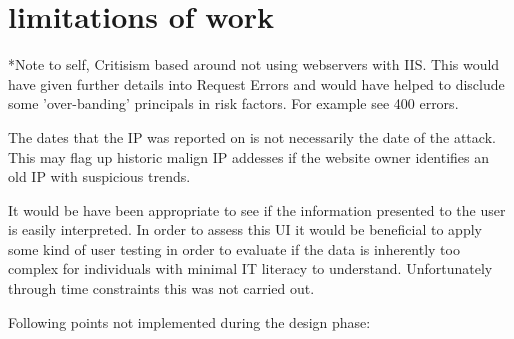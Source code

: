 \section{limitations of work}
*Note to self, Critisism based around not using webservers with IIS. This would have given further details into Request Errors and would have helped to disclude some 'over-banding' principals in risk factors. For example see 400 errors. 

The dates that the IP was reported on is not necessarily the date of the attack. This may flag up historic malign IP addesses if the website owner identifies an old IP with suspicious trends.

It would be have been appropriate to see if the information presented to the user is easily interpreted. In order to assess this UI it would be beneficial to apply some kind of user testing in order to evaluate if the data is inherently too complex for individuals with minimal IT literacy to understand. Unfortunately through time constraints this was not carried out.


Following points not implemented during the design phase:


 
 
 
